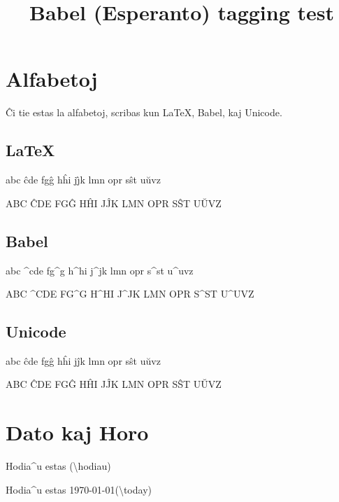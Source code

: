 \documentclass{article}
\title{Babel (Esperanto) tagging test}
\begin{document}
\section{Alfabetoj}
Ĉi tie estas la alfabetoj, scribas kun \LaTeX, Babel, kaj Unicode.

\subsection{LaTeX}
abc \^{c}de fg\^{g} h\^{h}i j\^{\j}k lmn opr s\^{s}t u\u{u}vz

ABC \^{C}DE FG\^{G} H\^{H}I J\^{J}K LMN OPR S\^{S}T U\u{U}VZ

\subsection{Babel}
abc ^cde fg^g h^hi j^jk lmn opr s^st u^uvz

ABC ^CDE FG^G H^HI J^JK LMN OPR S^ST U^UVZ

\subsection{Unicode}
abc ĉde fgĝ hĥi jĵk lmn opr sŝt uŭvz

ABC ĈDE FGĜ HĤI JĴK LMN OPR SŜT UŬVZ

\section{Dato kaj Horo}
Hodia^u estas \hodiau (\textbackslash hodiau)

Hodia^u estas \today (\textbackslash today)
\end{document}
